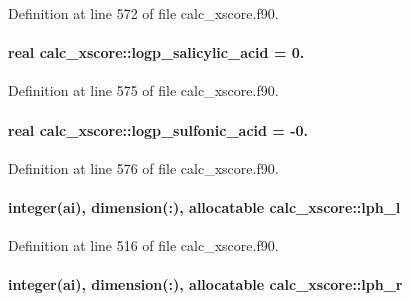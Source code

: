 Definition at line 572 of file calc\-\_\-xscore.\-f90.

\hypertarget{classcalc__xscore_a833567713752399cd4b2caeea9efcaf8}{
\paragraph[{logp\-\_\-salicylic\-\_\-acid}]{\setlength{\rightskip}{0pt plus 5cm}real calc\-\_\-xscore\-::logp\-\_\-salicylic\-\_\-acid = 0.}}\label{classcalc__xscore_a833567713752399cd4b2caeea9efcaf8}


Definition at line 575 of file calc\-\_\-xscore.\-f90.

\hypertarget{classcalc__xscore_a061c7d7389e7c0cf2b5850ab7fc5c934}{
\paragraph[{logp\-\_\-sulfonic\-\_\-acid}]{\setlength{\rightskip}{0pt plus 5cm}real calc\-\_\-xscore\-::logp\-\_\-sulfonic\-\_\-acid = -\/0.}}\label{classcalc__xscore_a061c7d7389e7c0cf2b5850ab7fc5c934}


Definition at line 576 of file calc\-\_\-xscore.\-f90.

\hypertarget{classcalc__xscore_ac3d7b816ffb1e654a5c9364fe2b7333c}{
\paragraph[{lph\-\_\-l}]{\setlength{\rightskip}{0pt plus 5cm}integer(ai), dimension(\-:), allocatable calc\-\_\-xscore\-::lph\-\_\-l}}\label{classcalc__xscore_ac3d7b816ffb1e654a5c9364fe2b7333c}


Definition at line 516 of file calc\-\_\-xscore.\-f90.

\hypertarget{classcalc__xscore_af54cb6976b82ec91add995e128a48ce3}{
\paragraph[{lph\-\_\-r}]{\setlength{\rightskip}{0pt plus 5cm}integer(ai), dimension(\-:), allocatable calc\-\_\-xscore\-::lph\-\_\-r}}\label{classcalc__xscore_af54cb6976b82ec91add995e128a48ce3}


